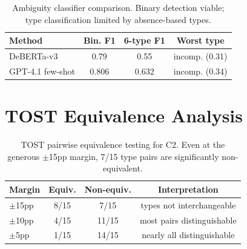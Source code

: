 \documentclass[11pt,a4paper]{article}
\begin{document}
\begin{table}[t]
\centering
\small
\begin{tabular}{lccc}
\toprule
\textbf{Method} & \textbf{Bin. F1} & \textbf{6-type F1} & \textbf{Worst type} \\
\midrule
DeBERTa-v3 & 0.79 & 0.55 & incomp. (0.31) \\
GPT-4.1 few-shot & 0.806 & 0.632 & incomp. (0.34) \\
\bottomrule
\end{tabular}
\caption{Ambiguity classifier comparison. Binary detection viable; type classification limited by absence-based types.}
\label{tab:classifier}
\end{table}

\section{TOST Equivalence Analysis}
\label{app:tost}

\begin{table}[t]
\centering
\small
\begin{tabular}{lccc}
\toprule
\textbf{Margin} & \textbf{Equiv.} & \textbf{Non-equiv.} & \textbf{Interpretation} \\
\midrule
$\pm$15pp & 8/15 & 7/15 & types not interchangeable \\
$\pm$10pp & 4/15 & 11/15 & most pairs distinguishable \\
$\pm$5pp & 1/15 & 14/15 & nearly all distinguishable \\
\bottomrule
\end{tabular}
\caption{TOST pairwise equivalence testing for C2. Even at the generous $\pm$15pp margin, 7/15 type pairs are significantly non-equivalent.}
\label{tab:tost}
\end{table}
\end{document}
